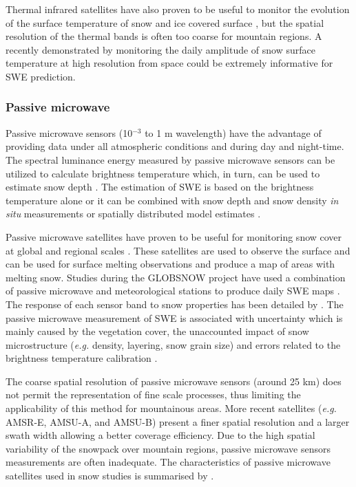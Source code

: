 \documentclass[utf8]{frontiersSCNS} %
\begin{document}
Thermal infrared satellites have also proven to be useful to monitor the evolution of the surface temperature of snow and ice covered surface \citep[e.g.][]{Dozier_2004,Freville_2014}, but the spatial resolution of the thermal bands is often too coarse for mountain regions. A recently demonstrated by \citet{Colombo_2019} monitoring the daily amplitude of snow surface temperature at high resolution from space could be extremely informative for SWE prediction. 

\subsubsection{Passive microwave}

Passive microwave sensors (10$^{-3}$ to 1 m wavelength) have the advantage of providing data under all atmospheric conditions and during day and night-time. The spectral luminance energy measured by passive microwave sensors can be utilized to calculate brightness temperature which, in turn, can be used to estimate snow depth \citep{Chang_1982}. The estimation of SWE is based on the brightness temperature alone or it can be combined with snow depth and snow density \textit{in situ} measurements \citep{Chang_1987,Cho_2017,Davenport_2012} or spatially distributed model estimates \citep{Boone_2006,Smith_2018}.

Passive microwave satellites have proven to be useful for monitoring snow cover at global and regional scales \citep{Armstrong_1995}. These satellites are used to observe the surface and can be used for surface melting observations \citep{Picard_2006} and produce a map of areas with melting snow. Studies during the GLOBSNOW project have used a combination of passive microwave and meteorological stations to produce daily SWE maps \citep{Luojus_2014}. The response of each sensor band to snow properties has been detailed by \citet{Rango_1993}. The passive microwave measurement of SWE is associated with uncertainty which is mainly caused by the vegetation cover, the unaccounted impact of snow microstructure (\textit{e.g.} density, layering, snow grain size) and errors related to the brightness temperature calibration \citep{Foster_2005}. 

The coarse spatial resolution of passive microwave sensors (around 25 km) does not permit the representation of fine scale processes, thus limiting the applicability of this method for mountainous areas. More recent satellites (\textit{e.g.} AMSR-E, AMSU-A, and AMSU-B) present a finer spatial resolution and a larger swath width allowing a better coverage efficiency. Due to the high spatial variability of the snowpack over mountain regions, passive microwave sensors measurements are often inadequate. The characteristics of passive microwave satellites used in snow studies is summarised by \citet{Konig_2001}.
\end{document}
